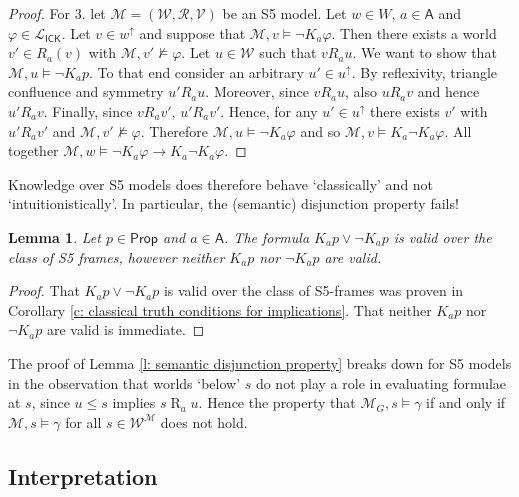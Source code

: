 \documentclass{myifcolog}
\newcommand{\K}{K}
\newcommand\Prop {\mathsf{Prop}}
\newcommand\A{\mathsf{A}}
\newcommand{\agi}{a}
\newcommand{\ICK}{\mathsf{ICK}}
\newcommand{\LICK}{\mathcal{L}_{\ICK}}
\newcommand{\fw}{\mathcal{M}}
\newcommand{\Rel}{\mathrel{R}}
\newcommand{\W}{\mathcal{W}}
\newcommand{\rel}{\mathcal{R}}
\newcommand{\V}{\mathcal{V}}
\newtheorem{lemma}[theorem]{Lemma}
\numberwithin{theorem}{section}
\begin{document}
\begin{proof}
   \noindent For 3. let $\fw=(\W, \rel, \V)$ be an S5 model. Let $w \in W$, $\agi \in \A$ and $\varphi \in \LICK$. Let $v \in w^\uparrow$ and suppose that $\fw,v \models \neg \K_\agi \varphi$. Then there exists a world $v' \in R_\agi(v)$ with $\fw, v' \not \models \varphi$. Let $u \in \W$ such that $v \mathrel{R_\agi} u$. We want to show that $\fw,u \models \neg \K_\agi p$. To that end consider an arbitrary $u' \in u^\uparrow$. By reflexivity, triangle confluence and symmetry $u' \mathrel{R_\agi} u$. Moreover, since $v \mathrel{R_\agi} u$, also $u \mathrel{R_\agi} v$ and hence $u' \mathrel{R_\agi} v$. Finally, since $v \mathrel{R_\agi} v'$, $u' \mathrel{R_\agi} v'$. Hence, for any $u' \in u^\uparrow$ there exists $v'$ with $u' \mathrel{R_\agi} v'$ and $\fw,v' \not \models \varphi$. Therefore $\fw, u \models \neg \K_\agi \varphi$ and so $\fw, v \models \K_\agi \neg \K_\agi \varphi$. All together $\fw,w \models \neg \K_\agi \varphi \rightarrow \K_\agi \neg \K_\agi \varphi$.
\end{proof}

Knowledge over S5 models does therefore behave `classically' and not `intuitionistically'. In particular, the (semantic) disjunction property fails!

\begin{lemma}\label{l: disjunction property S5 fails}
    Let $p \in \Prop$ and $\agi \in \A$. The formula $\K_\agi p \vee \neg \K_\agi p$ is valid over the class of S5 frames, however neither $\K_\agi p$ nor $\neg \K_\agi p$ are valid.
\end{lemma}
\begin{proof}
    That $\K_\agi p \vee \neg \K_\agi p$ is valid over the class of S5-frames was proven in Corollary \ref{c: classical truth conditions for implications}. That neither $\K_\agi p$ nor $\neg \K_\agi p$ are valid is immediate.
\end{proof}

The proof of Lemma \ref{l: semantic disjunction property} breaks down for S5 models in the observation that worlds `below' $s$ do not play a role in evaluating formulae at $s$, since $u \leq s$ implies $s \Rel_\agi u$. Hence the property that $\fw_G, s \models \gamma$ if and only if $\fw, s \models \gamma$ for all $s \in \W^\fw$ does not hold.

\subsection{Interpretation}\label{ss: interpretation}
\end{document}
